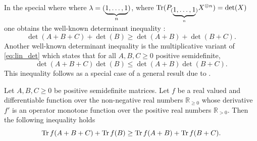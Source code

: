 \documentclass[notitlepage, 10pt]{article}
\begin{document}
In the special where where $\lambda = (\underbrace{1,\ldots,1}_n)$, where $\operatorname{Tr}(P_{(\underbrace{1,\ldots,1}_n)} X^{\otimes n}) = \det(X)$ one obtains the well-known determinant inequality \cite[Lemma 2.2]{tie2011rearrangement}:
\begin{equation}
    \label{eq:lin_det}
    \det(A+B+C) + \det(B) \geq \det(A+B) + \det(B+C).
\end{equation}
Another well-known determinant inequality is the multiplicative variant of \cref{eq:lin_det} which states that for all $A,B,C \geq 0 $ positive semidefinite,
\begin{equation}
    \label{eq:mul_det}
    \det(A+B+C)\det(B) \leq \det(A+B)\det(B+C).
\end{equation}
This inequality follows as a special case of a general result due to \citeauthor{sagnol2013approximation} \cite[Proposition 2.3]{sagnol2013approximation}.
\begin{thm}
    \label{thm:sagnol_ineq}
    Let $A,B,C \geq 0$ be positive semidefinite matrices.
    Let $f$ be a real valued and differentiable function over the non-negative real numbers $\mathbb R_{\geq 0}$ whose derivative $f'$ is an operator monotone function over the positive real numbers $\mathbb R_{>0}$.
    Then the following inequality holds
    \begin{equation}
        \label{eq:sagnol_ineq}
        \operatorname{Tr} f(A+B+C) 
        +
        \operatorname{Tr} f(B)
        \geq
        \operatorname{Tr} f(A+B)
        +
        \operatorname{Tr} f(B+C).
    \end{equation}
\end{thm}
\end{document}
